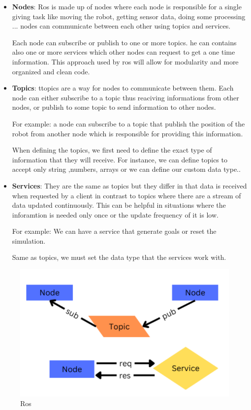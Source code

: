 \documentclass[12pt]{extarticle}
\begin{document}
\begin{itemize}
\item \textbf{Nodes}: Ros is made up of nodes where  each node     is responsible for a single giving task like moving the robot, getting sensor data, doing some processing ... 
nodes can communicate between each other using topics and services.

Each node can subscribe or publish  to one or more topics. he can contains also one or more services which other nodes can request to get a one time information. This approach used by ros will allow for modularity and more organized and clean code.

     



\item \textbf{Topics}: ttopics are a way for nodes to communicate between them. Each node can either subscribe to a topic thus reaciving informations from other nodes, or publish to some topic to send information to other nodes.

For example: a node can subscribe to a topic that publish the position of the robot  from another node which is responsible for providing this information.

When defining the topics, we first need to define the exact type of information that they will receive. For instance, we can define topics to accept only string ,numbers, arrays or we can define our custom data type..


\item \textbf{Services}:  They are the same as topics but they differ in that data is received when requested by a client in contrast to topics where there are a stream of data updated continuously. This can be helpful in situations where the inforamtion is needed only once or the update frequency of it is low.
 


For example: We can have a service that generate goals or reset the simulation.

Same as topics, we  must set the data type that the services work with.


\end{itemize}
 

 
 \begin{figure}[h]  
\centering
\includegraphics[scale=0.4]{ros}
\caption[Ros]{Ros}
\end{figure}
\end{document}
